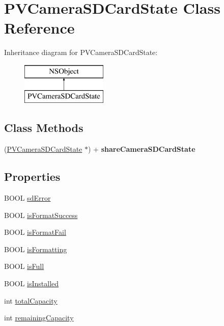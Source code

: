 \hypertarget{interface_p_v_camera_s_d_card_state}{}\section{P\+V\+Camera\+S\+D\+Card\+State Class Reference}
\label{interface_p_v_camera_s_d_card_state}
Inheritance diagram for P\+V\+Camera\+S\+D\+Card\+State\+:\begin{figure}[H]
\begin{center}
\leavevmode
\includegraphics[height=2.000000cm]{interface_p_v_camera_s_d_card_state}
\end{center}
\end{figure}
\subsection*{Class Methods}
\begin{DoxyCompactItemize}
\item 
\mbox{\label{interface_p_v_camera_s_d_card_state_ab95eb1ff98a00b3b5c0a6dd7889cf6e6}} 
(\hyperlink{interface_p_v_camera_s_d_card_state}{P\+V\+Camera\+S\+D\+Card\+State} $\ast$) + {\bfseries share\+Camera\+S\+D\+Card\+State}
\end{DoxyCompactItemize}
\subsection*{Properties}
\begin{DoxyCompactItemize}
\item 
B\+O\+OL \hyperlink{interface_p_v_camera_s_d_card_state_ad3b52c4ab0221ab298304695bc492f96}{sd\+Error}
\item 
B\+O\+OL \hyperlink{interface_p_v_camera_s_d_card_state_aa0d97b329076d812169387dd54e75626}{is\+Format\+Success}
\item 
B\+O\+OL \hyperlink{interface_p_v_camera_s_d_card_state_a9d6d298a360aeb26c3a7c198fcc0d660}{is\+Format\+Fail}
\item 
B\+O\+OL \hyperlink{interface_p_v_camera_s_d_card_state_ac54ae951bf262c9aa315360973f61a71}{is\+Formatting}
\item 
B\+O\+OL \hyperlink{interface_p_v_camera_s_d_card_state_ad3f062e3cc4d05c8f3771761e262b43a}{is\+Full}
\item 
B\+O\+OL \hyperlink{interface_p_v_camera_s_d_card_state_ac5440c4efbb4d69a535841063015f1a7}{is\+Installed}
\item 
int \hyperlink{interface_p_v_camera_s_d_card_state_a9cc5c54d277c7d8e09a1a9905bb2228e}{total\+Capacity}
\item 
int \hyperlink{interface_p_v_camera_s_d_card_state_a0f6a84b12858fa5784031df897ad6626}{remaining\+Capacity}
\end{DoxyCompactItemize}



